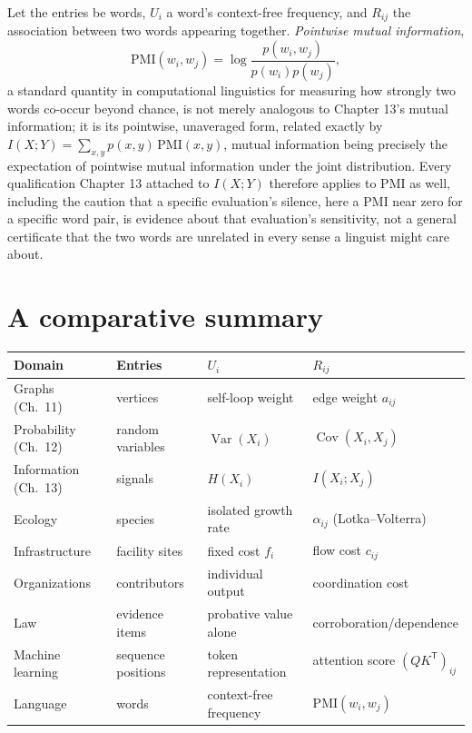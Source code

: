 \documentclass[11pt]{book}
\begin{document}
Let the entries be words, $U_i$ a word's context-free frequency, and $R_{ij}$ the association between two words appearing together. \emph{Pointwise mutual information},
\[
\mathrm{PMI}(w_i,w_j) = \log\frac{p(w_i,w_j)}{p(w_i)p(w_j)},
\]
a standard quantity in computational linguistics for measuring how strongly two words co-occur beyond chance, is not merely analogous to Chapter 13's mutual information; it is its pointwise, unaveraged form, related exactly by $I(X;Y)=\sum_{x,y}p(x,y)\,\mathrm{PMI}(x,y)$, mutual information being precisely the expectation of pointwise mutual information under the joint distribution. Every qualification Chapter 13 attached to $I(X;Y)$ therefore applies to PMI as well, including the caution that a specific evaluation's silence, here a PMI near zero for a specific word pair, is evidence about that evaluation's sensitivity, not a general certificate that the two words are unrelated in every sense a linguist might care about.

\section{A comparative summary}

\begin{center}
\begin{tabular}{|l|l|l|l|}
\hline
\textbf{Domain} & \textbf{Entries} & \textbf{$U_i$} & \textbf{$R_{ij}$} \\
\hline
Graphs (Ch.\ 11) & vertices & self-loop weight & edge weight $a_{ij}$ \\
Probability (Ch.\ 12) & random variables & $\operatorname{Var}(X_i)$ & $\operatorname{Cov}(X_i,X_j)$ \\
Information (Ch.\ 13) & signals & $H(X_i)$ & $I(X_i;X_j)$ \\
Ecology & species & isolated growth rate & $\alpha_{ij}$ (Lotka--Volterra) \\
Infrastructure & facility sites & fixed cost $f_i$ & flow cost $c_{ij}$ \\
Organizations & contributors & individual output & coordination cost \\
Law & evidence items & probative value alone & corroboration/dependence \\
Machine learning & sequence positions & token representation & attention score $(QK^{\mathsf T})_{ij}$ \\
Language & words & context-free frequency & $\mathrm{PMI}(w_i,w_j)$ \\
\hline
\end{tabular}
\end{center}
\end{document}
